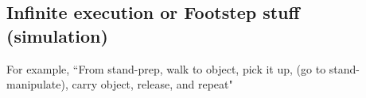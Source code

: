 \subsection{Infinite execution or Footstep stuff (simulation)}

For example, ``From stand-prep, walk to object, pick it up, (go to stand-manipulate), carry object, release, and repeat"


